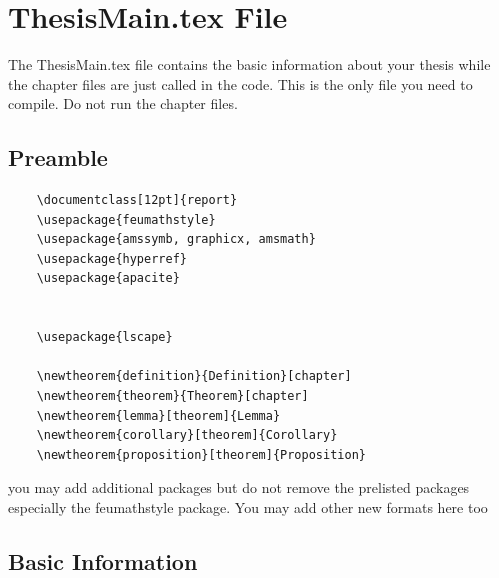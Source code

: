 
\chapter{ThesisMain.tex File}
\label{chap:Main}


The ThesisMain.tex file contains the basic information about your thesis while the chapter files are just called in the code.  This is the only file you need to compile. Do not run the chapter files.

\section{Preamble}

\begin{verbatim} 
	\documentclass[12pt]{report}
	\usepackage{feumathstyle}  
	\usepackage{amssymb, graphicx, amsmath}
	\usepackage{hyperref}
	\usepackage{apacite}
	
	
	\usepackage{lscape}
	
	\newtheorem{definition}{Definition}[chapter]
	\newtheorem{theorem}{Theorem}[chapter]
	\newtheorem{lemma}[theorem]{Lemma}
	\newtheorem{corollary}[theorem]{Corollary}
	\newtheorem{proposition}[theorem]{Proposition}
 \end{verbatim}

you may add additional packages but do not remove the prelisted packages especially the feumathstyle package.
You may add other new formats here too


\section{Basic Information}

